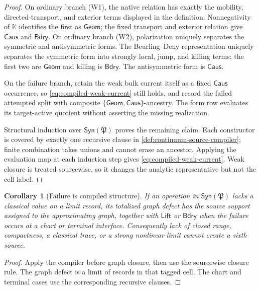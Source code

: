 \documentclass[11pt]{article}
\numberwithin{section}{part}
\theoremstyle{plain}
\newtheorem{corollary}[corollary]{Corollary}
\theoremstyle{definition}
\theoremstyle{remark}
\newcommand{\Geom}{\mathsf{Geom}}
\newcommand{\Caus}{\mathsf{Caus}}
\newcommand{\Lift}{\mathsf{Lift}}
\newcommand{\Bdry}{\mathsf{Bdry}}
\begin{document}
\begin{proof}
On ordinary branch \textup{(W1)}, the native relation has exactly the mobility,
directed-transport, and exterior terms displayed in the definition.
Nonnegativity of \(\mathbb K\) identifies the first as \(\Geom\); the fixed
transport and exterior relation give \(\Caus\) and \(\Bdry\).
On ordinary branch \textup{(W2)}, polarization uniquely separates the symmetric and
antisymmetric forms.  The Beurling--Deny representation uniquely separates
the symmetric form into strongly local, jump, and killing terms; the first
two are \(\Geom\) and killing is \(\Bdry\).  The antisymmetric form is
\(\Caus\).

On the failure branch, retain the weak bulk current itself as a fixed
\(\Caus\) occurrence, so \eqref{eq:compiled-weak-current} still holds, and
record the failed attempted split with composite
\(\{\Geom,\Caus\}\)-ancestry.  The form row evaluates its target-active
quotient without asserting the missing realization.

Structural induction over \(\mathsf{Syn}(\mathfrak P)\) proves the remaining
claim.  Each constructor is covered by exactly one recursive clause in
\cref{def:continuum-source-compiler}; finite combination takes unions and
cannot erase an ancestor.  Applying the evaluation map at each induction step
gives \eqref{eq:compiled-weak-current}.  Weak closure is treated sourcewise,
so it changes the analytic representative but not the cell label.
\end{proof}

\begin{corollary}[Failure is compiled structure]
\label{cor:failure-is-compiled-structure}
If an operation in \(\mathsf{Syn}(\mathfrak P)\) lacks a classical value on a
limit record, its totalized graph defect has the source support assigned to
the approximating graph, together with \(\Lift\) or \(\Bdry\) when the
failure occurs at a chart or terminal interface.  Consequently lack of
closed range, compactness, a classical trace, or a strong nonlinear limit
cannot create a sixth source.
\end{corollary}

\begin{proof}
Apply the compiler before graph closure, then use the sourcewise closure rule.
The graph defect is a limit of records in that tagged cell.  The chart and
terminal cases use the corresponding recursive clauses.
\end{proof}
\end{document}
